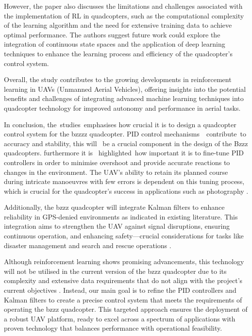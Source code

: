 \documentclass{article}
\begin{document}
However, the paper also discusses the limitations and challenges associated with
the implementation of RL in quadcopters, such as the computational complexity of
the learning algorithm and the need for extensive training data to achieve
optimal performance. The authors suggest future work could explore the
integration of continuous state spaces and the application of deep learning
techniques to enhance the learning process and efficiency of the quadcopter's
control system.

Overall, the study contributes to the growing developments in reinforcement
learning in UAVs (Unmanned Aerial Vehicles), offering insights into the
potential benefits and challenges of integrating advanced machine learning
techniques into quadcopter technology for improved autonomy and performance in
aerial tasks.

In conclusion, the studies emphasises how crucial it is to design a quadcopter
control system for the bzzzz quadcopter. PID control mechanisms  contribute to
accuracy and stability, this will  be a crucial component in the design of the
Bzzz quadcopters. furthermore it is  highlighted how important it is to
fine-tune PID controllers in order to minimise overshoot and provide accurate
reactions to changes in the environment. The UAV's ability to retain its planned
course during intricate manoeuvres with few errors is dependent on this tuning
process, which is crucial for the quadcopter's success in applications such as
photography \cite{photographyAndVideo}.

Additionally, the bzzz quadcopter will integrate Kalman filters to enhance
reliability in GPS-denied environments as indicated in existing literature. This
integration aims to strengthen the UAV against signal disruptions, ensuring
continuous operation, and enhancing safety—crucial considerations for tasks like
disaster management \cite{disasterManagement} and search and rescue operations
\cite{searchAndRescue}.

Although reinforcement learning shows promising advancements, this technology
will not be utilised in the current version of the bzzz quadcopter due to its
complexity and extensive data requirements that do not align with the project's
current objectives \cite{ReinforcementLearning}. Instead, our main goal is to
refine the PID controllers and Kalman filters to create a precise control system
that meets the requirements of operating the bzzz quadcopter. This targeted
approach ensures the deployment of a robust UAV platform, ready to excel across
a spectrum of applications with proven technology that balances performance with
operational feasibility.
\end{document}
